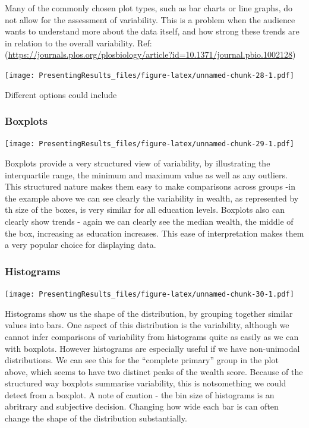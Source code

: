 \documentclass[
  titlepage]{book}
\begin{document}
Many of the commonly chosen plot types, such as bar charts or line graphs, do not allow for the assessment of variability. This is a problem when the audience wants to understand more about the data itself, and how strong these trends are in relation to the overall variability. Ref: (\url{https://journals.plos.org/plosbiology/article?id=10.1371/journal.pbio.1002128})

\texttt{[image: PresentingResults\_files/figure-latex/unnamed-chunk-28-1.pdf]}

Different options could include

\hypertarget{boxplots}{%
\subsubsection{Boxplots}\label{boxplots}}

\texttt{[image: PresentingResults\_files/figure-latex/unnamed-chunk-29-1.pdf]}

Boxplots provide a very structured view of variability, by illustrating the interquartile range, the minimum and maximum value as well as any outliers. This structured nature makes them easy to make comparisons across groups -in the example above we can see clearly the variability in wealth, as represented by th size of the boxes, is very similar for all education levels. Boxplots also can clearly show trends - again we can clearly see the median wealth, the middle of the box, increasing as education increases. This ease of interpretation makes them a very popular choice for displaying data.

\hypertarget{histograms}{%
\subsubsection{Histograms}\label{histograms}}

\texttt{[image: PresentingResults\_files/figure-latex/unnamed-chunk-30-1.pdf]}

Histograms show us the shape of the distribution, by grouping together similar values into bars. One aspect of this distribution is the variability, although we cannot infer comparisons of variability from histograms quite as easily as we can with boxplots. However histograms are especially useful if we have non-unimodal distributions. We can see this for the ``complete primary'' group in the plot above, which seems to have two distinct peaks of the wealth score. Because of the structured way boxplots summarise variability, this is notsomething we could detect from a boxplot. A note of caution - the bin size of histograms is an abritrary and subjective decision. Changing how wide each bar is can often change the shape of the distribution substantially.
\end{document}
